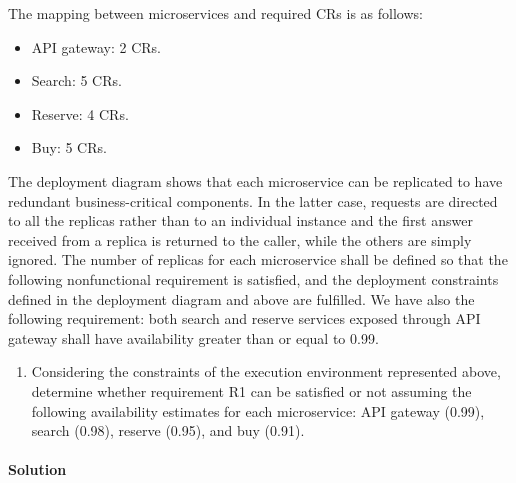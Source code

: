 The mapping between microservices and required CRs is as follows:
\begin{itemize}
    \item API gateway: 2 CRs.
    \item Search: 5 CRs.
    \item Reserve: 4 CRs.
    \item Buy: 5 CRs.
\end{itemize}
The deployment diagram shows that each microservice can be replicated to have redundant business-critical components. 
In the latter case, requests are directed to all the replicas rather than to an individual instance and the first answer received from a replica is returned to the caller, while the others are simply ignored. 
The number of replicas for each microservice shall be defined so that the following nonfunctional requirement is satisfied, and the deployment constraints defined in the deployment diagram and above are fulfilled.
We have also the following requirement: both search and reserve services exposed through API gateway shall have availability greater than or equal to 0.99. 
\begin{enumerate}
    \item Considering the constraints of the execution environment represented above, determine whether requirement R1 can be satisfied or not assuming the following availability estimates for each microservice: API gateway (0.99), search (0.98), reserve (0.95), and buy (0.91).
\end{enumerate}





\paragraph*{Solution}
